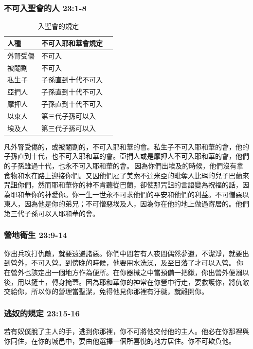\subsubsection{不可入聖會的人 23:1-8 }
\begin{table}
\vspace*{-10mm}
\centering
\begin{tabular}{|l|l|}\hline\hline
人種& 不可入耶和華會規定   \\\hline
外腎受傷& 不可入    \\\hline
被閹割&  不可入 \\\hline
私生子 &子孫直到十代不可入 \\\hline
亞捫人　&子孫直到十代不可入　\\\hline
摩押人　&子孫直到十代不可入\\\hline
以東人　&第三代子孫可以入　\\\hline
埃及人&第三代子孫可以入　\\\hline
\hline
\end{tabular}
\caption{入聖會的規定}
\end{table}
凡外腎受傷的，或被閹割的，不可入耶和華的會。私生子不可入耶和華的會，他的子孫直到十代，也不可入耶和華的會。亞捫人或是摩押人不可入耶和華的會，他們的子孫雖過十代，也永不可入耶和華的會。 因為你們出埃及的時候，他們沒有拿食物和水在路上迎接你們。又因他們雇了美索不達米亞的毗奪人比珥的兒子巴蘭來咒詛你們，然而耶和華你的神不肯聽從巴蘭，卻使那咒詛的言語變為祝福的話，因為耶和華你的神愛你。你一生一世永不可求他們的平安和他們的利益。不可憎惡以東人，因為他是你的弟兄；不可憎惡埃及人，因為你在他的地上做過寄居的。他們第三代子孫可以入耶和華的會。


\subsubsection{營地衛生 23:9-14 }
你出兵攻打仇敵，就要遠避諸惡。你們中間若有人夜間偶然夢遺，不潔淨，就要出到營外，不可入營。到傍晚的時候，他要用水洗澡，及至日落了才可以入營。 你在營外也該定出一個地方作為便所。在你器械之中當預備一把鍬，你出營外便溺以後，用以鏟土，轉身掩蓋。因為耶和華你的神常在你營中行走，要救護你，將仇敵交給你，所以你的營理當聖潔，免得他見你那裡有汙穢，就離開你。

\subsubsection{逃奴的規定 23:15-16 }
若有奴僕脫了主人的手，逃到你那裡，你不可將他交付他的主人。他必在你那裡與你同住，在你的城邑中，要由他選擇一個所喜悅的地方居住。你不可欺負他。

